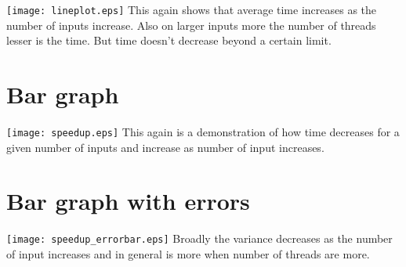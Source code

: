 \documentclass{article}
\begin{document}
\texttt{[image: lineplot.eps]}\newline 
This again shows that average time increases as the number of inputs increase. Also on larger inputs more the number of threads lesser is the time. But time doesn't decrease beyond a certain limit.
\newpage 

\section{Bar graph}
\texttt{[image: speedup.eps]}\newline 
This again is a demonstration of how time decreases for a given number of inputs and increase as number of input increases.
\newpage 
\section{Bar graph with errors}
\texttt{[image: speedup\_errorbar.eps]}\newline
Broadly the variance decreases as the number of input increases and in general is more when number of threads are more.
\end{document}

